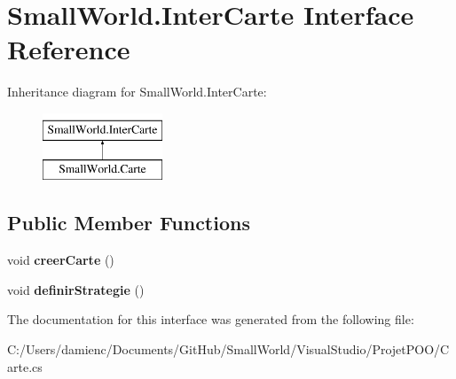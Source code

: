 \hypertarget{interface_small_world_1_1_inter_carte}{\section{Small\-World.\-Inter\-Carte Interface Reference}
\label{interface_small_world_1_1_inter_carte}
}
Inheritance diagram for Small\-World.\-Inter\-Carte\-:\begin{figure}[H]
\begin{center}
\leavevmode
\includegraphics[height=2.000000cm]{interface_small_world_1_1_inter_carte}
\end{center}
\end{figure}
\subsection*{Public Member Functions}
\begin{DoxyCompactItemize}
\item 
\hypertarget{interface_small_world_1_1_inter_carte_aa74e8d2a86277fdd29fcf2529020f205}{void {\bfseries creer\-Carte} ()}\label{interface_small_world_1_1_inter_carte_aa74e8d2a86277fdd29fcf2529020f205}

\item 
\hypertarget{interface_small_world_1_1_inter_carte_a846d9483ff804a7e3df4584e451cc9bb}{void {\bfseries definir\-Strategie} ()}\label{interface_small_world_1_1_inter_carte_a846d9483ff804a7e3df4584e451cc9bb}

\end{DoxyCompactItemize}


The documentation for this interface was generated from the following file\-:\begin{DoxyCompactItemize}
\item 
C\-:/\-Users/damienc/\-Documents/\-Git\-Hub/\-Small\-World/\-Visual\-Studio/\-Projet\-P\-O\-O/Carte.\-cs\end{DoxyCompactItemize}
